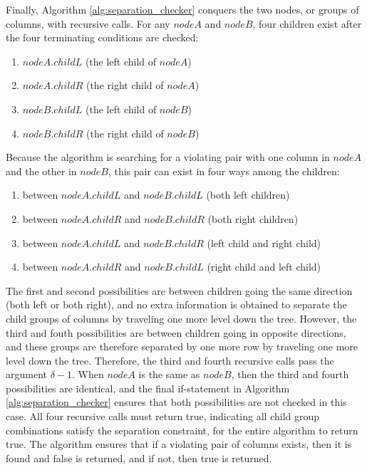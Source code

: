 Finally, Algorithm \ref{alg:separation_checker} conquers the two nodes, or groups of columns, with recursive calls.
For any $\mathit{nodeA}$ and $\mathit{nodeB}$, four children exist after the four terminating conditions are checked:
\begin{enumerate}  
\item $\mathit{nodeA.childL}$ (the left child of $\mathit{nodeA}$)
\item $\mathit{nodeA.childR}$ (the right child of $\mathit{nodeA}$)
\item $\mathit{nodeB.childL}$ (the left child of $\mathit{nodeB}$)
\item $\mathit{nodeB.childR}$ (the right child of $\mathit{nodeB}$)
\end{enumerate}
Because the algorithm is searching for a violating pair with one column in $\mathit{nodeA}$ and the other in $\mathit{nodeB}$, this pair can exist in four ways among the children:
\begin{enumerate}  
\item between $\mathit{nodeA.childL}$ and $\mathit{nodeB.childL}$ (both left children)
\item between $\mathit{nodeA.childR}$ and $\mathit{nodeB.childR}$ (both right children)
\item between $\mathit{nodeA.childL}$ and $\mathit{nodeB.childR}$ (left child and right child)
\item between $\mathit{nodeA.childR}$ and $\mathit{nodeB.childL}$ (right child and left child)
\end{enumerate}
The first and second possibilities are between children going the same direction (both left or both right), and no extra information is obtained to separate the child groups of columns by traveling one more level down the tree.
However, the third and fouth possibilities are between children going in opposite directions, and these groups are therefore separated by one more row by traveling one more level down the tree.
Therefore, the third and fourth recursive calls pass the argument $\delta - 1$.
When $nodeA$ is the same as $nodeB$, then the third and fourth possibilities are identical, and the final if-statement in Algorithm \ref{alg:separation_checker} ensures that both possibilities are not checked in this case.
All four recursive calls must return true, indicating all child group combinations satisfy the separation constraint, for the entire algorithm to return true.
The algorithm ensures that if a violating pair of columns exists, then it is found and false is returned, and if not, then true is returned.

